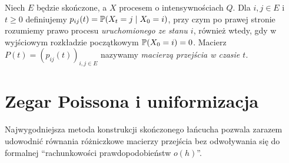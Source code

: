 \begin{definicja}
Niech $E$ będzie skończone, a $X$ procesem o intensywnościach
$Q$. Dla $i,j\in E$ i $t\ge0$ definiujemy
$p_{ij}(t)=\mathbb{P}(X_t=j\mid X_0=i)$,
przy czym po prawej stronie rozumiemy prawo procesu
\emph{uruchomionego ze stanu $i$}, również wtedy,
gdy w wyjściowym rozkładzie początkowym $\mathbb{P}(X_0=i)=0$.
Macierz $P(t)=(p_{ij}(t))_{i,j\in E}$ nazywamy
\emph{macierzą przejścia w czasie $t$}.
\end{definicja}

\section{Zegar Poissona i uniformizacja}
Najwygodniejsza metoda konstrukcji skończonego łańcucha
pozwala zarazem udowodnić równania różniczkowe macierzy
przejścia bez odwoływania się do formalnej ``rachunkowości
prawdopodobieństw $o(h)$''.

